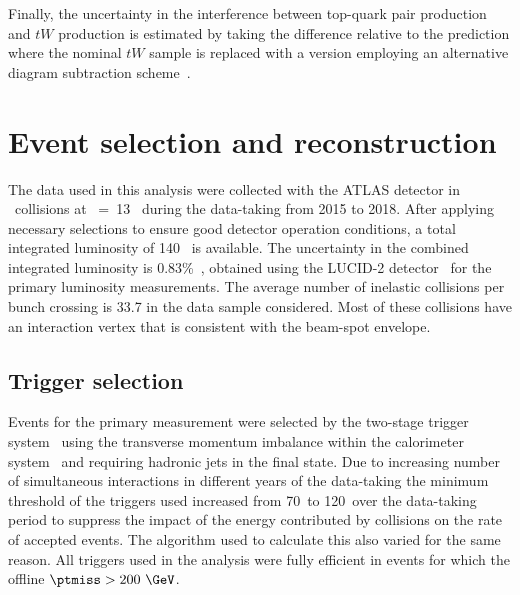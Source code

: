 \documentclass[atlasdraft=false, cernpreprint, UKenglish, texmf, orcidlogo]{atlasdoc}
\begin{document}
Finally, the uncertainty in the interference between top-quark pair production and $tW$ production
is estimated by taking the difference relative to the prediction where the nominal $tW$ sample
is replaced with a version employing an alternative diagram subtraction scheme~\cite{Frixione:2008yi}.
 
 


 

\section{Event selection and reconstruction}
\label{sec:events}
 
 
The data used in this analysis were collected with the ATLAS detector in \pp\ collisions  at \sqs~=~13~\TeV{} during the \RunTwo{}
data-taking from 2015 to 2018.
After applying necessary selections to ensure good detector operation conditions, a total integrated luminosity of 140~\ifb{} is available.
The uncertainty in the combined \RunTwo{} integrated luminosity is 0.83\%~\cite{DAPR-2021-01},
obtained using the LUCID-2 detector~\cite{LUCID2} for the primary luminosity measurements.
The average number of inelastic \pp{} collisions per bunch crossing
is 33.7 in the data sample considered. 
Most of  these \pp{} collisions have an interaction vertex that is consistent with the beam-spot envelope.
 
\subsection{Trigger selection}
 
Events for the primary \ptmiss measurement were selected by the two-stage trigger system~\cite{TRIG-2016-01} using the transverse momentum
imbalance within the calorimeter system~\cite{TRIG-2019-01} and requiring hadronic jets in the final state.
Due to  increasing  number of simultaneous \pp interactions in different years of the \RunTwo data-taking the
minimum \ptmiss threshold of the triggers used increased from 70~\GeV to 120~\GeV over the data-taking period
to suppress the impact of the energy contributed by \pileup{} collisions on the rate of accepted events. The algorithm
used to calculate this \ptmiss also varied for the same reason.
All \ptmiss  triggers used in the analysis  were  fully efficient in events for which the offline \( \ptmiss > 200~\GeV\).
 
\end{document}
